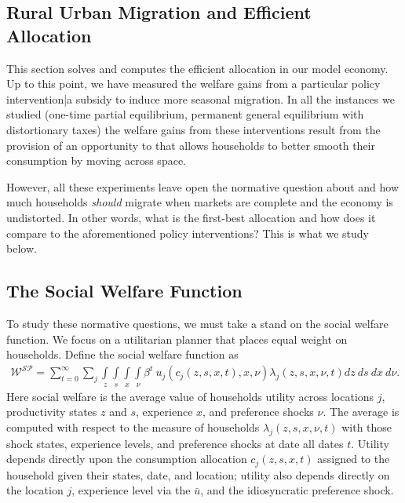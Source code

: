 \documentclass[12pt,pdftex]{article}
\begin{document}
\begin{onehalfspacing}
\newpage

\normalsize



\section{Rural Urban Migration and Efficient Allocation}\label{sed:intro}

This section solves and computes the efficient allocation in our model economy. Up to this point, we have measured the welfare gains from a particular policy intervention|a subsidy to induce more seasonal migration. In all the instances we studied (one-time partial equilibrium, permanent general equilibrium with distortionary taxes) the welfare gains from these interventions result from the provision of an opportunity to that allows households to better smooth their consumption by moving across space.

However, all these experiments leave open the normative question about and how much households \emph{should} migrate when markets are complete and the economy is undistorted. In other words, what is the first-best allocation and how does it compare to the aforementioned policy interventions? This is what we study below.

\subsection{The Social Welfare Function}

To study these normative questions, we must take a stand on the social welfare function. We focus on a utilitarian planner that places equal weight on households. Define the social welfare function as
\begin{align}
\mathcal{W^{SP}} = \sum_{t=0}^{\infty}\sum_{j} \int\limits_{z} \int\limits_{s} \int\limits_{x} \int\limits_{\nu} \beta^{t} \ u_{j}(c_{j}(z, s, x, t), x, \nu) \lambda_{j}(z, s, x, \nu, t) dz \ ds \ dx \ d\nu.
\label{eq:sp-social_welfare}
\end{align}
Here social welfare is the average value of households utility across locations $j$, productivity states $z$ and $s$, experience $x$, and preference shocks $\nu$. The average is computed with respect to the measure of households $\lambda_{j}(z, s, x, \nu, t)$ with those shock states, experience levels, and preference shocks at date all dates $t$. Utility depends directly upon the consumption allocation $c_{j}(z, s, x, t)$ assigned to the household given their states, date, and location; utility also depends directly on the location $j$, experience level via the $\bar u$, and the idiosyncratic preference shock.


\end{onehalfspacing}
\end{document}
